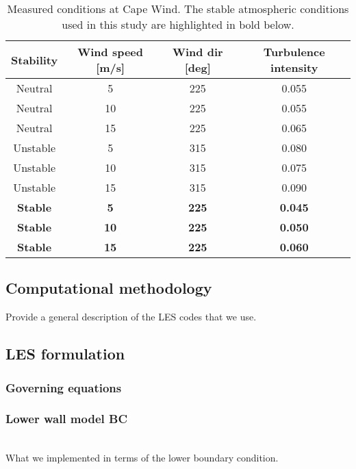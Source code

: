 \begin{table}
\caption{\label{tab:CapeWindMeasurements} Measured conditions at Cape
  Wind.  The stable atmospheric conditions used in this study are
  highlighted in bold below.} \centering
\begin{tabular}{cccc}
  \hline
  Stability    & Wind speed [m/s] & Wind dir [deg] & Turbulence intensity \\
  \hline
  Neutral      & 5                & 225            & 0.055           \\
  Neutral      & 10               & 225            & 0.055           \\
  Neutral      & 15               & 225            & 0.065           \\
  Unstable     & 5                & 315            & 0.080           \\
  Unstable     & 10               & 315            & 0.075           \\
  Unstable     & 15               & 315            & 0.090           \\
  \bf{Stable}  & \bf{5}           & \bf{225}       & \bf{0.045}      \\
  \bf{Stable}  & \bf{10}          & \bf{225}       & \bf{0.050}      \\
  \bf{Stable}  & \bf{15}          & \bf{225}       & \bf{0.060}      \\
\hline
\end{tabular}
\end{table}


\subsection{Computational methodology}
Provide a general description of the LES codes that we use.

\subsection{LES formulation}

\subsubsection{Governing equations}

\subsubsection{\label{sec:wallmodelBC}Lower wall model BC}
\\
What we implemented in terms of the lower boundary condition.

